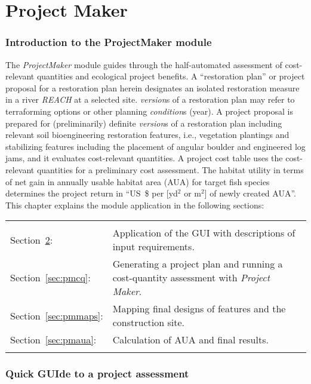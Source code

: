 \newpage
\part{Project Maker} \label{part:pm}

\section{Introduction to the ProjectMaker module} \label{sec:pmintro}
The \textit{ProjectMaker} module guides through the half-automated assessment of cost-relevant quantities and ecological project benefits. A ``restoration plan'' or project proposal for a restoration plan herein designates an isolated restoration measure in a river \emph{REACH} at a selected site. \emph{version}s of a restoration plan may refer to terraforming options or other planning \emph{condition}s (year). A project proposal is prepared for (preliminarily) definite \emph{version}s of a restoration plan including relevant soil bioengineering restoration features, i.e., vegetation plantings and stabilizing features including the placement of angular boulder and engineered log jams, and it evaluates cost-relevant quantities. A project cost table uses the cost-relevant quantities for a preliminary cost assessment. The habitat utility in terms of net gain in annually usable habitat area (AUA) for target fish species determines the project return in ``US~\$ per [yd$^2$ or m$^2$] of newly created AUA''.\\ 

This chapter explains the module application in the following sections:\\
\begin{tabular}{l L{0.9\textwidth}}
\\
Section~\ref{sec:pmquick}: & Application of the GUI with descriptions of input requirements.\\
Section~\ref{sec:pmcq}:  & Generating a project plan and running a cost-quantity assessment with \textit{Project Maker}.\\
Section~\ref{sec:pmmaps}:  & Mapping final designs of features and the construction site.\\
Section~\ref{sec:pmaua}:  & Calculation of AUA and final results.\\
\\
\end{tabular}


\section{Quick GUIde to a project assessment} \label{sec:pmquick}
